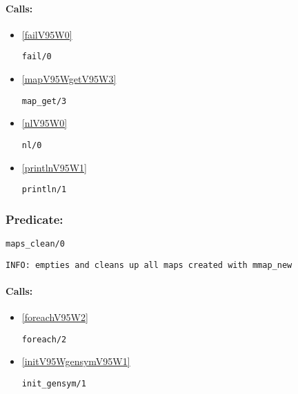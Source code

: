 \paragraph{Calls:} 
\begin{itemize}
\item \ref{failV95W0} 
\begin{verbatim}
fail/0
\end{verbatim}

\item \ref{mapV95WgetV95W3} 
\begin{verbatim}
map_get/3
\end{verbatim}

\item \ref{nlV95W0} 
\begin{verbatim}
nl/0
\end{verbatim}

\item \ref{printlnV95W1} 
\begin{verbatim}
println/1
\end{verbatim}

\end{itemize}

\subsubsection{Predicate:} \label{mapsV95WcleanV95W0}

\begin{verbatim}
maps_clean/0
\end{verbatim}

{\small \begin{verbatim}
INFO: empties and cleans up all maps created with mmap_new

\end{verbatim}}
\paragraph{Calls:} 
\begin{itemize}
\item \ref{foreachV95W2} 
\begin{verbatim}
foreach/2
\end{verbatim}

\item \ref{initV95WgensymV95W1} 
\begin{verbatim}
init_gensym/1
\end{verbatim}

\end{itemize}

